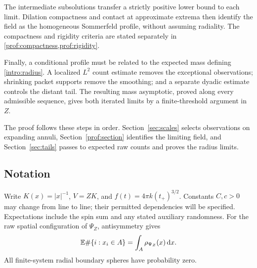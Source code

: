 The intermediate subsolutions transfer a strictly positive lower bound
to each limit.  Dilation compactness and contact at approximate extrema
then identify the field as the homogeneous Sommerfeld profile, without
assuming radiality.  The compactness and rigidity criteria are stated
separately in \cref{prof:compactness,prof:rigidity}.

Finally, a conditional profile must be related to the expected mass
defining \eqref{intro:radius}.  A localized $L^2$ count estimate removes
the exceptional observations; shrinking packet supports remove the
smoothing; and a separate dyadic estimate controls the distant tail.
The resulting mass asymptotic, proved along every admissible sequence,
gives both iterated limits by a finite-threshold argument in $Z$.

The proof follows these steps in order.  Section~\ref{sec:scales}
selects observations on expanding annuli, Section~\ref{prof:section}
identifies the limiting field, and Section~\ref{sec:tails} passes to
expected raw counts and proves the radius limits.

\subsection{Notation}

Write $K(x)=|x|^{-1}$, $V=ZK$, and $f(t)=4\pi k(t_+)^{3/2}$.
Constants $C,c>0$ may change from line to line; their permitted
dependencies will be specified.
Expectations include the spin sum and any stated auxiliary randomness.
For the raw spatial configuration of $\Psi_Z$, antisymmetry gives
\begin{equation}\label{intro:count-density}
 \mathbb E\#\{i:x_i\in A\}=\int_A\rho_{\Psi_Z}(x)\,\mathrm d x.
\end{equation}
All finite-system radial boundary spheres have probability zero.
